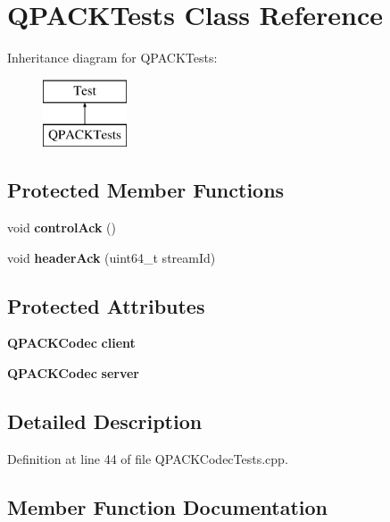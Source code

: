 \section{Q\+P\+A\+C\+K\+Tests Class Reference}
\label{classQPACKTests}
Inheritance diagram for Q\+P\+A\+C\+K\+Tests\+:\begin{figure}[H]
\begin{center}
\leavevmode
\includegraphics[height=2.000000cm]{classQPACKTests}
\end{center}
\end{figure}
\subsection*{Protected Member Functions}
\begin{DoxyCompactItemize}
\item 
void {\bf control\+Ack} ()
\item 
void {\bf header\+Ack} (uint64\+\_\+t stream\+Id)
\end{DoxyCompactItemize}
\subsection*{Protected Attributes}
\begin{DoxyCompactItemize}
\item 
{\bf Q\+P\+A\+C\+K\+Codec} {\bf client}
\item 
{\bf Q\+P\+A\+C\+K\+Codec} {\bf server}
\end{DoxyCompactItemize}


\subsection{Detailed Description}


Definition at line 44 of file Q\+P\+A\+C\+K\+Codec\+Tests.\+cpp.



\subsection{Member Function Documentation}

